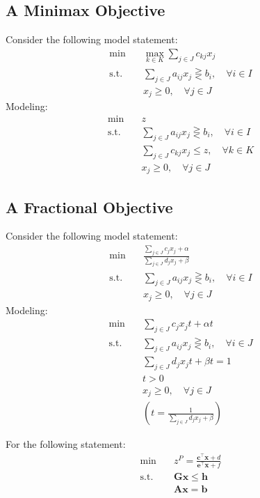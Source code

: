 				\subsection{A Minimax Objective}
					Consider the following model statement:
					\begin{align}
						\min \quad & \max_{k\in K}\sum_{j\in J}c_{kj}x_j \\
						\text{s.t.} \quad & \sum_{j\in J}a_{ij}x_j \gtreqless b_i, \quad \forall i\in I \\
						                  & x_j \ge 0, \quad \forall j\in J 
					\end{align}
					Modeling:
					\begin{align}
						\min \quad & z \\
						\text{s.t.} \quad & \sum_{j\in J}a_{ij}x_j \gtreqless b_i, \quad \forall i\in I \\
										  & \sum_{j\in J}c_{kj}x_j \le z, \quad \forall k\in K \\
						                  & x_j \ge 0, \quad \forall j\in J 
					\end{align}
				\subsection{A Fractional Objective}
					Consider the following model statement:
					\begin{align}
						\min \quad & \frac{\sum_{j\in J}c_{j}x_j + \alpha}{\sum_{j\in J}d_{j}x_j + \beta} \\
						\text{s.t.} \quad & \sum_{j\in J}a_{ij}x_j \gtreqless b_i, \quad \forall i\in I \\
						                  & x_j \ge 0, \quad \forall j\in J 
					\end{align}
					Modeling:
					\begin{align}
						\min \quad & \sum_{j\in J}c_{j}x_jt + \alpha t \\
						\text{s.t.} \quad & \sum_{j\in J}a_{ij}x_j \gtreqless b_i, \quad \forall i\in J \\
										  & \sum_{j\in J}d_jx_jt + \beta t = 1\\
										  & t > 0 \\
						                  & x_j \ge 0, \quad \forall j\in J \\
						                  & (t = \frac1{\sum_{j\in J}d_jx_j + \beta}) 
					\end{align}

					For the following statement:
					\begin{align}
						\min \quad & z^P = \frac{\mathbf{c^\top x} + d}{\mathbf{e^\top x} + f}\\
						\text{s.t.} \quad & \mathbf{Gx} \le \mathbf{h}\\
						                  & \mathbf{Ax} = \mathbf{b}
					\end{align}


